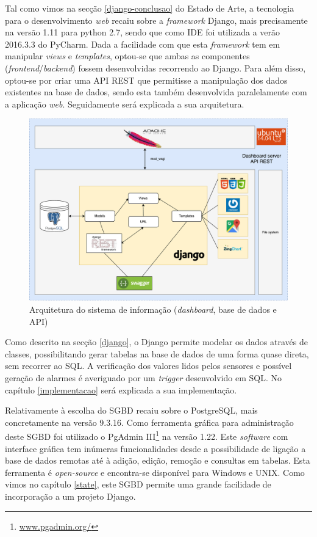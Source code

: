 Tal como vimos na secção \ref{django-conclusao} do Estado de Arte, a tecnologia para o desenvolvimento \textit{web} recaiu sobre a \textit{framework} Django, mais precisamente na versão 1.11 para python 2.7, sendo que como \ac{IDE} foi utilizada a verão 2016.3.3 do PyCharm. Dada a facilidade com que esta \textit{framework} tem em manipular \textit{views} e \textit{templates}, optou-se que ambas as componentes (\textit{frontend}/\textit{backend}) fossem desenvolvidas recorrendo ao Django. Para além disso, optou-se por criar uma API REST que permitisse a manipulação dos dados existentes na base de dados, sendo esta também desenvolvida paralelamente com a aplicação \textit{web}. Seguidamente será explicada a sua arquitetura.   



\begin{figure}[h]
	\centering
	\includegraphics[width=\linewidth]{esquemas/fisica-si.pdf}
	\caption{Arquitetura do sistema de informação (\textit{dashboard}, base de dados e API)}
	\label{arquiteturasi}
\end{figure}




Como descrito na secção \ref{django}, o Django permite modelar os dados através de classes, possibilitando gerar tabelas na base de dados de uma forma quase direta, sem recorrer ao \ac{SQL}. A verificação dos valores lidos pelos sensores e possível geração de alarmes é averiguado por um \textit{trigger} desenvolvido em \ac{SQL}. No capítulo \ref{implementacao} será explicada a sua implementação.  


Relativamente à escolha do \ac{SGBD} recaiu sobre o PostgreSQL, mais concretamente na versão 9.3.16. Como ferramenta gráfica para administração deste \ac{SGBD} foi utilizado o PgAdmin III\footnote{\url{www.pgadmin.org/}} na versão 1.22. Este \textit{software} com interface gráfica tem inúmeras funcionalidades desde a possibilidade de ligação a base de dados remotas até à adição, edição, remoção e  consultas em tabelas. Esta ferramenta é \textit{open-source} e encontra-se disponível para Windows e UNIX. Como vimos no capítulo \ref{state}, este \ac{SGBD} permite uma grande facilidade de incorporação a um projeto Django. 


